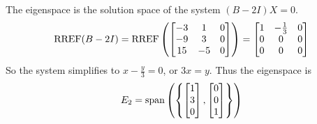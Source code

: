 \documentclass{sbgLAquiz}
\begin{document}
\begin{solution}
The eigenspace is the solution space of the system $(B-2I)X=0$.
$$\operatorname{RREF}(B-2I)=\operatorname{RREF}\left(\begin{bmatrix} -3 & 1 & 0 \\ -9 & 3 & 0 \\ 15 & - 5 & 0 \end{bmatrix} \right) = \begin{bmatrix} 1 & -\frac{1}{3} & 0 \\ 0 & 0 & 0 \\ 0 & 0 & 0 \end{bmatrix}$$
So the system simplifies to $x-\frac{y}{3}=0$, or $3x=y$.  Thus the eigenspace is $$E_2 = {\rm span}\left( \left\{ \begin{bmatrix} 1 \\ 3 \\ 0 \end{bmatrix}, \begin{bmatrix} 0 \\ 0 \\ 1\end{bmatrix} \right\} \right)$$
\end{solution}
\end{document}
